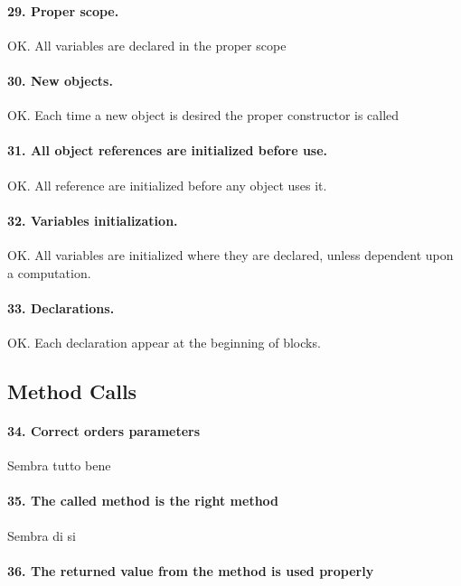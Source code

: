 \documentclass[english]{article}
\begin{document}
\paragraph{29. Proper scope.} 
OK. All variables are declared in the proper scope

\paragraph{30. New objects.} 
OK. Each time a new object is desired the proper constructor is called

\paragraph{31. All object references are initialized before use.} 
OK. All reference are initialized before any object uses it. 

\paragraph{32. Variables initialization.} 
OK. All variables are initialized where they are declared, unless dependent upon a computation.

\paragraph{33. Declarations.} OK. Each declaration appear at the beginning of blocks.

\subsection{Method Calls}

\paragraph{34. Correct orders parameters}

Sembra tutto bene

\paragraph{35. The called method is the right method}

Sembra di si

\paragraph{36. The returned value from the method is used properly}
\end{document}
